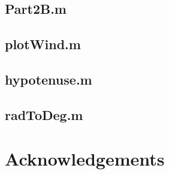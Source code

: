 \documentclass{article}
\begin{document}
\subsection{Part2B.m}


\subsection{plotWind.m}


\subsection{hypotenuse.m}


\subsection{radToDeg.m}



\section{Acknowledgements}
\end{document}
